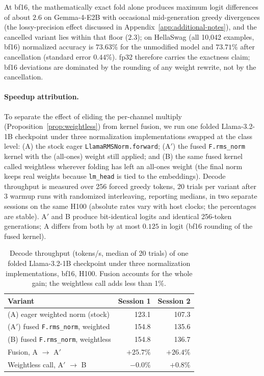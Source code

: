 \documentclass{article}
\begin{document}
At bf16, the mathematically exact fold alone produces maximum logit differences of about $2.6$ on Gemma-4-E2B with occasional mid-generation greedy divergences (the lossy-precision effect discussed in Appendix~\ref{app:additional-notes}), and the cancelled variant lies within that floor ($2.3$); on HellaSwag (all 10{,}042 examples, bf16) normalized accuracy is $73.63\%$ for the unmodified model and $73.71\%$ after cancellation (standard error $0.44\%$). fp32 therefore carries the exactness claim; bf16 deviations are dominated by the rounding of any weight rewrite, not by the cancellation.

\paragraph{Speedup attribution.} To separate the effect of eliding the per-channel multiply (Proposition~\ref{prop:weightless}) from kernel fusion, we run one folded Llama-3.2-1B checkpoint under three normalization implementations swapped at the class level: (A) the stock eager \texttt{LlamaRMSNorm.forward}; (A$'$) the fused \texttt{F.rms\_norm} kernel with the (all-ones) weight still applied; and (B) the same fused kernel called weightless wherever folding has left an all-ones weight (the final norm keeps real weights because \texttt{lm\_head} is tied to the embeddings). Decode throughput is measured over 256 forced greedy tokens, 20 trials per variant after 3 warmup runs with randomized interleaving, reporting medians, in two separate sessions on the same H100 (absolute rates vary with host clocks; the percentages are stable). A$'$ and B produce bit-identical logits and identical 256-token generations; A differs from both by at most $0.125$ in logit (bf16 rounding of the fused kernel).

\begin{table}[h!] \centering
\caption{Decode throughput (tokens/s, median of 20 trials) of one folded Llama-3.2-1B checkpoint under three normalization implementations, bf16, H100. Fusion accounts for the whole gain; the weightless call adds less than 1\%.}
\label{tab:attribution}
\begin{tabular}{l r r}
\hline
Variant & Session 1 & Session 2 \\
\hline
(A) eager weighted norm (stock)             & 123.1 & 107.3 \\
(A$'$) fused \texttt{F.rms\_norm}, weighted & 154.8 & 135.6 \\
(B) fused \texttt{F.rms\_norm}, weightless  & 154.8 & 136.7 \\
\hline
Fusion, A $\to$ A$'$                        & $+25.7\%$ & $+26.4\%$ \\
Weightless call, A$'$ $\to$ B               & $-0.0\%$  & $+0.8\%$ \\
\hline
\end{tabular}
\end{table}
\end{document}
